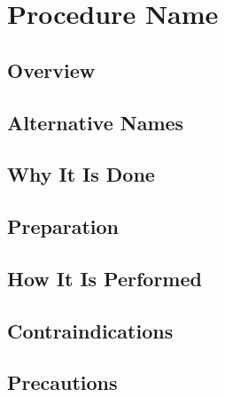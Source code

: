 
\chapter{Procedure Name}

\section*{Overview}

\section*{Alternative Names}

\section*{Why It Is Done}

\section*{Preparation}

\section*{How It Is Performed}

\section*{Contraindications}

\section*{Precautions}

